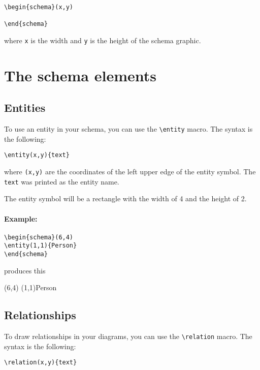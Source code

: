 \documentclass[a4paper,11pt]{article}
\begin{document}
\begin{verbatim}
\begin{schema}(x,y)

\end{schema}
\end{verbatim}

where {\tt x} is the width and {\tt y} is the height of 
the schema graphic.

\section{The schema elements}

\subsection{Entities}

To use an entity in your schema, you can use the \verb|\entity| macro.
The syntax is the following:

\begin{verbatim}
\entity(x,y){text}
\end{verbatim}

where {\tt (x,y)} are the coordinates of the left upper edge of the entity
symbol. The {\tt text} was printed as the entity name.

The entity symbol will be a rectangle with the width of 4 and the height of 2.

\paragraph{Example:}
\begin{verbatim}
\begin{schema}(6,4)
\entity(1,1){Person}
\end{schema}
\end{verbatim}

produces this

\begin{schema}(6,4)
\entity(1,1){Person}
\end{schema}

\subsection{Relationships}

To draw relationships in your diagrams, you can use the \verb|\relation| macro.
The syntax is the following:

\begin{verbatim}
\relation(x,y){text}
\end{verbatim}
\end{document}
